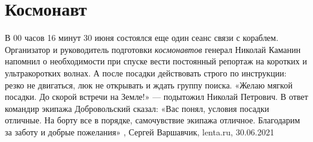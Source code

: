 
 
 
 
 
\chapter{Космонавт}
\label{sec:slova.kosmonavt}

В 00 часов 16 минут 30 июня состоялся еще один сеанс связи с кораблем.
Организатор и руководитель подготовки \emph{космонавтов} генерал Николай Каманин
напомнил о необходимости при спуске вести постоянный репортаж на коротких и
ультракоротких волнах. А после посадки действовать строго по инструкции: резко
не двигаться, люк не открывать и ждать группу поиска.  «Желаю мягкой посадки.
До скорой встречи на Земле!» — подытожил Николай Петрович. В ответ командир
экипажа Добровольский сказал: «Вас понял, условия посадки отличные. На борту
все в порядке, самочувствие экипажа отличное. Благодарим за заботу и добрые
пожелания»
, Сергей Варшавчик, lenta.ru, 30.06.2021


